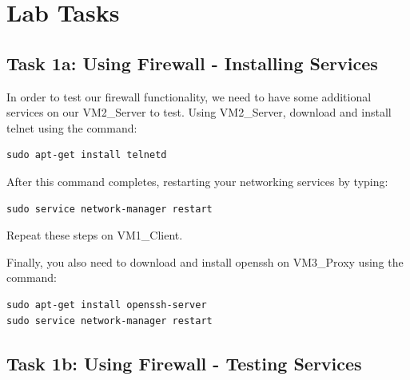 \section{Lab Tasks}

\subsection{Task 1a: Using Firewall - Installing Services}
In order to test our firewall functionality, we need to have some additional services on our VM2\_Server to test. Using VM2\_Server, download and install telnet using the command:

\begin{verbatim}
sudo apt-get install telnetd
\end{verbatim}
 After this command completes, restarting your networking services by typing: \medskip
\begin{verbatim}
sudo service network-manager restart
\end{verbatim}

Repeat these steps on VM1\_Client.

Finally, you also need to download and install openssh on VM3\_Proxy using the command:
\begin{verbatim}
sudo apt-get install openssh-server
sudo service network-manager restart
\end{verbatim}

\subsection{Task 1b: Using Firewall - Testing Services}

